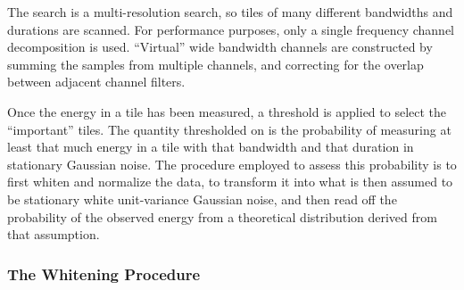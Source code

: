 \documentclass[10pt]{article}
\begin{document}
The search is a multi-resolution search, so tiles of many different
bandwidths and durations are scanned.  For performance purposes, only a
single frequency channel decomposition is used.  ``Virtual'' wide bandwidth
channels are constructed by summing the samples from multiple channels, and
correcting for the overlap between adjacent channel filters.

Once the energy in a tile has been measured, a threshold is applied to
select the ``important'' tiles.  The quantity thresholded on is the
probability of measuring at least that much energy in a tile with that
bandwidth and that duration in stationary Gaussian noise.  The procedure
employed to assess this probability is to first whiten and normalize the
data, to transform it into what is then assumed to be stationary white
unit-variance Gaussian noise, and then read off the probability of the
observed energy from a theoretical distribution derived from that
assumption.


\subsubsection{The Whitening Procedure}
\end{document}
